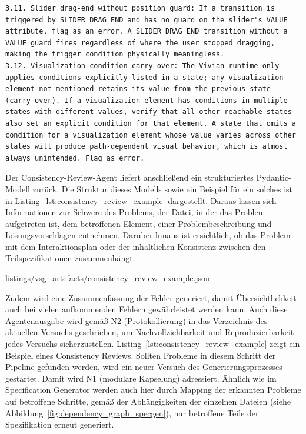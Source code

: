 \begin{lstlisting}
3.11. Slider drag-end without position guard: If a transition is triggered by SLIDER_DRAG_END and has no guard on the slider's VALUE attribute, flag as an error. A SLIDER_DRAG_END transition without a VALUE guard fires regardless of where the user stopped dragging, making the trigger condition physically meaningless.
3.12. Visualization condition carry-over: The Vivian runtime only applies conditions explicitly listed in a state; any visualization element not mentioned retains its value from the previous state (carry-over). If a visualization element has conditions in multiple states with different values, verify that all other reachable states also set an explicit condition for that element. A state that omits a condition for a visualization element whose value varies across other states will produce path-dependent visual behavior, which is almost always unintended. Flag as error.
\end{lstlisting}

Der Consistency-Review-Agent liefert anschließend ein strukturiertes Pydantic-Modell zurück. Die Struktur dieses Modells sowie ein Beispiel für ein solches ist in Listing~\ref{lst:consistency_review_example} dargestellt. Daraus lassen sich Informationen zur Schwere des Problems, der Datei, in der das Problem aufgetreten ist, dem betroffenen Element, einer Problembeschreibung und Lösungsvorschlägen entnehmen. Darüber hinaus ist ersichtlich, ob das Problem mit dem Interaktionsplan oder der inhaltlichen Konsistenz zwischen den Teilspezifikationen zusammenhängt.


{listings/vsg_artefacts/consistency_review_example.json}

Zudem wird eine Zusammenfassung der Fehler generiert, damit Übersichtlichkeit auch bei vielen aufkommenden Fehlern gewährleistet werden kann. Auch diese Agentenausgabe wird gemäß N2 (Protokollierung) in das Verzeichnis des aktuellen Versuchs geschrieben, um Nachvollziehbarkeit und Reproduzierbarkeit jedes Versuchs sicherzustellen. Listing~\ref{lst:consistency_review_example} zeigt ein Beispiel eines Consistency Reviews.
Sollten Probleme in diesem Schritt der Pipeline gefunden werden, wird ein neuer Versuch des Generierungsprozesses gestartet. Damit wird N1 (modulare Kapselung) adressiert. Ähnlich wie im Specification Generator werden auch hier durch Mapping der erkannten Probleme auf betroffene Schritte, gemäß der Abhängigkeiten der einzelnen Dateien (siehe Abbildung~\ref{fig:dependency_graph_specgen}), nur betroffene Teile der Spezifikation erneut generiert.

